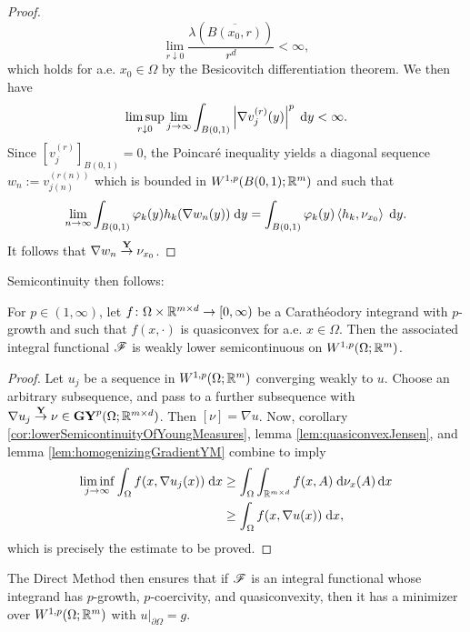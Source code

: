 \begin{proof}
    \begin{equation}
        \lim_{r \downarrow 0} \frac{\lambda(\overline{B(x_0,r)})}{r^d} < \infty,
    \end{equation}
    which holds for a.e. $x_0 \in \Omega$ by the Besicovitch differentiation theorem. We then have 
    \begin{equation}
        \limsup_{r \downarrow 0} \lim_{j \to \infty} \int_{B(0,1)} \left\lvert {\nabla v_j^{(r)}(y)} \right\rvert^p \; \mathrm{d} y < \infty.
    \end{equation}
    Since $[v_j^{(r)}]_{B(0,1)} = 0$, the Poincar\'e inequality yields a diagonal sequence $w_n := v_{j(n)}^{(r(n))}$ which is bounded in $W^{1,p}(B(0,1);\mathbb{R}^m)$ and such that 
    \begin{equation}
        \lim_{n \to \infty} \int_{B(0,1)} \varphi_k(y) h_k(\nabla w_n(y)) \; \mathrm{d} y = \int_{B(0,1)} \varphi_k(y) \left\langle {h_k,\nu_{x_0}} \right\rangle \; \mathrm{d} y.
    \end{equation}
    It follows that $\nabla w_n \overset{\mathbf{Y}}{\rightarrow} \nu_{x_0}$.
\end{proof}
Semicontinuity then follows:
\begin{theorem}
    For $p \in (1,\infty)$, let $f \colon \Omega \times \mathbb{R}^{m \times d} \to [0,\infty)$ be a Carath\'eodory integrand with $p$-growth and such that $f(x,\cdot)$ is quasiconvex for a.e. $x \in \Omega$. Then the associated integral functional $\mathscr{F}$ is weakly lower semicontinuous on $W^{1,p}(\Omega;\mathbb{R}^m)$.
\end{theorem}
\begin{proof}
    Let $u_j$ be a sequence in $W^{1,p}(\Omega;\mathbb{R}^m)$ converging weakly to $u$. Choose an arbitrary subsequence, and pass to a further subsequence with $\nabla u_j \overset{\mathbf{Y}}{\rightarrow} \nu \in \mathbf{GY}^p(\Omega;\mathbb{R}^{m \times d})$. Then $[\nu] = \nabla u$. Now, corollary \ref{cor:lowerSemicontinuityOfYoungMeasures}, lemma \ref{lem:quasiconvexJensen}, and lemma \ref{lem:homogenizingGradientYM} combine to imply 
    \begin{equation} \begin{aligned}
        \liminf_{j \to \infty} \int_\Omega f(x,\nabla u_j(x)) \; \mathrm{d} x 
        &\geq \int_\Omega \int_{\mathbb{R}^{m \times d}} f(x,A) \; \mathrm{d}\nu_x(A) \, \mathrm{d} x \\
        &\geq \int_\Omega f(x,\nabla u(x)) \; \mathrm{d} x,
    \end{aligned} \end{equation}
    which is precisely the estimate to be proved.
\end{proof}
The Direct Method then ensures that if $\mathscr{F}$ is an integral functional whose integrand has $p$-growth, $p$-coercivity, and quasiconvexity, then it has a minimizer over $W^{1,p}(\Omega;\mathbb{R}^m)$ with $u \vert_{\partial \Omega} = g$.

